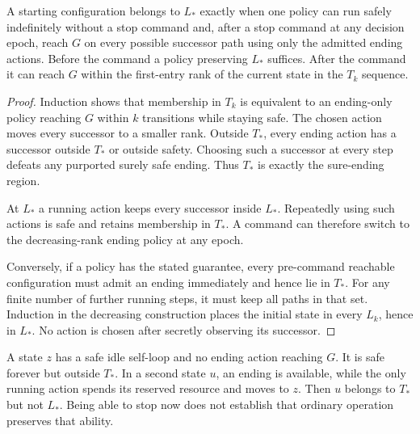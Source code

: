 \begin{theorem}\label{r:ending}
A starting configuration belongs to $L_*$ exactly when one policy can run safely indefinitely without a stop command and, after a stop command at any decision epoch, reach $G$ on every possible successor path using only the admitted ending actions. Before the command a policy preserving $L_*$ suffices. After the command it can reach $G$ within the first-entry rank of the current state in the $T_k$ sequence.
\end{theorem}
\begin{proof}
Induction shows that membership in $T_k$ is equivalent to an ending-only policy reaching $G$ within $k$ transitions while staying safe. The chosen action moves every successor to a smaller rank. Outside $T_*$, every ending action has a successor outside $T_*$ or outside safety. Choosing such a successor at every step defeats any purported surely safe ending. Thus $T_*$ is exactly the sure-ending region.

At $L_*$ a running action keeps every successor inside $L_*$. Repeatedly using such actions is safe and retains membership in $T_*$. A command can therefore switch to the decreasing-rank ending policy at any epoch.

Conversely, if a policy has the stated guarantee, every pre-command reachable configuration must admit an ending immediately and hence lie in $T_*$. For any finite number of further running steps, it must keep all paths in that set. Induction in the decreasing construction places the initial state in every $L_k$, hence in $L_*$. No action is chosen after secretly observing its successor.
\end{proof}

\begin{counterexample}\label{ce:ending}
A state $z$ has a safe idle self-loop and no ending action reaching $G$. It is safe forever but outside $T_*$. In a second state $u$, an ending is available, while the only running action spends its reserved resource and moves to $z$. Then $u$ belongs to $T_*$ but not $L_*$. Being able to stop now does not establish that ordinary operation preserves that ability.
\end{counterexample}

